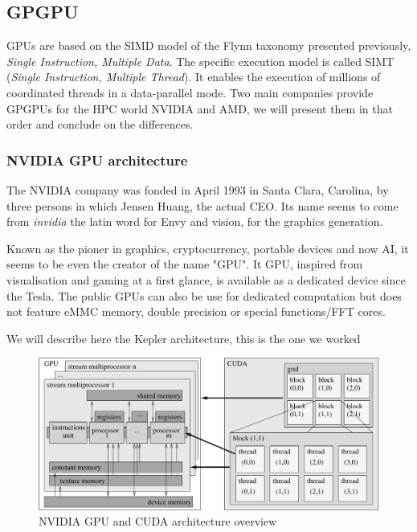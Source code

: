 \subsection{GPGPU}

GPUs are based on the SIMD model of the Flynn taxonomy presented previously, \emph{Single Instruction, Multiple Data}.
The specific execution model is called SIMT (\emph{Single Instruction, Multiple Thread}). It enables the execution of millions of coordinated threads in a data-parallel mode. 
Two main companies provide GPGPUs for the HPC world NVIDIA and AMD, we will present them in that order and conclude on the differences. 

\subsubsection{NVIDIA GPU architecture}

The NVIDIA company was fonded in April 1993 in Santa Clara, Carolina, by three persons in which Jensen Huang, the actual CEO.
Its name seems to come from \textit{invidia} the latin word for Envy and vision, for the graphics generation. 

Known as the pioner in graphics, cryptocurrency, portable devices and now AI, it seems to be even the creator of the name "GPU".
It GPU, inspired from visualisation and gaming at a first glance, is available as a dedicated device  since the Tesla. 
The public GPUs can also be use for dedicated computation but does not feature eMMC memory, double precision or special functions/FFT cores. 

We will describe here the Kepler architecture, this is the one we worked

\begin{figure}[t!]
\centering
\setlength\fboxsep{0pt}
\setlength\fboxrule{0.25pt}
\includegraphics[scale=0.6]{figures/chap1/smx}
\caption{NVIDIA GPU and CUDA architecture overview}
 \label{fig:chap1_gpu}
\end{figure}

